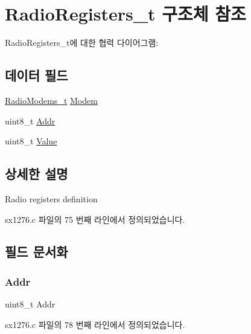 \hypertarget{struct_radio_registers__t}{}\section{Radio\+Registers\+\_\+t 구조체 참조}
\label{struct_radio_registers__t}


Radio\+Registers\+\_\+t에 대한 협력 다이어그램\+:
\subsection*{데이터 필드}
\begin{DoxyCompactItemize}
\item 
\mbox{\hyperlink{radio_8h_a992ef7a5b7f52975ba7bd8dd97740057}{Radio\+Modems\+\_\+t}} \mbox{\hyperlink{struct_radio_registers__t_a3490469594ac68c5d2dea9260e6a1536}{Modem}}
\item 
uint8\+\_\+t \mbox{\hyperlink{struct_radio_registers__t_a34a90d62794b3df273831bc6367cd2bf}{Addr}}
\item 
uint8\+\_\+t \mbox{\hyperlink{struct_radio_registers__t_a88f4d00bdab99ae6f48c7ae0bc468bb4}{Value}}
\end{DoxyCompactItemize}


\subsection{상세한 설명}
Radio registers definition 

sx1276.\+c 파일의 75 번째 라인에서 정의되었습니다.



\subsection{필드 문서화}
\mbox{\label{struct_radio_registers__t_a34a90d62794b3df273831bc6367cd2bf}} 
\subsubsection{\texorpdfstring{Addr}{Addr}}
{\footnotesize\ttfamily uint8\+\_\+t Addr}



sx1276.\+c 파일의 78 번째 라인에서 정의되었습니다.

\mbox{\label{struct_radio_registers__t_a3490469594ac68c5d2dea9260e6a1536}} 
